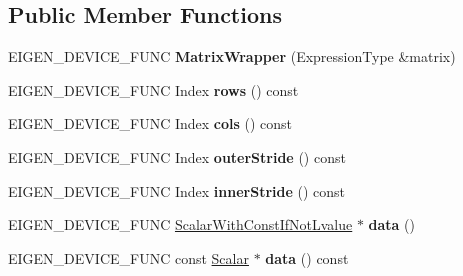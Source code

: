 \subsection*{Public Member Functions}
\begin{DoxyCompactItemize}
\item 
\mbox{\label{class_eigen_1_1_matrix_wrapper_ab647b9aa20d886b512d6c8ca6b1e5b53}} 
E\+I\+G\+E\+N\+\_\+\+D\+E\+V\+I\+C\+E\+\_\+\+F\+U\+NC {\bfseries Matrix\+Wrapper} (Expression\+Type \&matrix)
\item 
\mbox{\label{class_eigen_1_1_matrix_wrapper_aa198af8e5c7c22f1cac8d689b474c233}} 
E\+I\+G\+E\+N\+\_\+\+D\+E\+V\+I\+C\+E\+\_\+\+F\+U\+NC Index {\bfseries rows} () const
\item 
\mbox{\label{class_eigen_1_1_matrix_wrapper_a7eed37f8586009e50cc2d0cefe70c638}} 
E\+I\+G\+E\+N\+\_\+\+D\+E\+V\+I\+C\+E\+\_\+\+F\+U\+NC Index {\bfseries cols} () const
\item 
\mbox{\label{class_eigen_1_1_matrix_wrapper_a3c4979f2483d6da561b1b1cd5125c893}} 
E\+I\+G\+E\+N\+\_\+\+D\+E\+V\+I\+C\+E\+\_\+\+F\+U\+NC Index {\bfseries outer\+Stride} () const
\item 
\mbox{\label{class_eigen_1_1_matrix_wrapper_a4c23fb08f9e0a90792be17693274c7fa}} 
E\+I\+G\+E\+N\+\_\+\+D\+E\+V\+I\+C\+E\+\_\+\+F\+U\+NC Index {\bfseries inner\+Stride} () const
\item 
\mbox{\label{class_eigen_1_1_matrix_wrapper_a16deaf2493a5dbcc915104a05b90507a}} 
E\+I\+G\+E\+N\+\_\+\+D\+E\+V\+I\+C\+E\+\_\+\+F\+U\+NC \mbox{\hyperlink{struct_eigen_1_1internal_1_1true__type}{Scalar\+With\+Const\+If\+Not\+Lvalue}} $\ast$ {\bfseries data} ()
\item 
\mbox{\label{class_eigen_1_1_matrix_wrapper_ae324e45c1764da7b9c9a1e4c074c9b77}} 
E\+I\+G\+E\+N\+\_\+\+D\+E\+V\+I\+C\+E\+\_\+\+F\+U\+NC const \mbox{\hyperlink{class_eigen_1_1_dense_base_a5feed465b3a8e60c47e73ecce83e39a2}{Scalar}} $\ast$ {\bfseries data} () const
\item 
\mbox{\label{class_eigen_1_1_matrix_wrapper_ae82548a7eae48e54d156f0468a58cfaa}} 

\end{DoxyCompactItemize}
